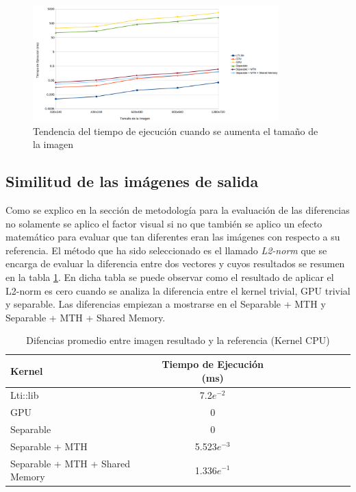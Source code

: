 \documentclass[conference]{IEEEtran}
\begin{document}
\begin{figure}[H]
\centering
\includegraphics[width=9.5cm]{varianza}
\caption{Tendencia del tiempo de ejecución cuando se aumenta el tamaño de la imagen}
\label{resol}
\end{figure}


\subsection{\textbf{Similitud de las imágenes de salida}}
Como se explico en la sección de metodología para la evaluación de las diferencias no solamente se aplico el factor visual si no que también se aplico un efecto matemático para evaluar que tan diferentes eran las imágenes con respecto a su referencia. El método que ha sido seleccionado es el llamado \textit{L2-norm} que se encarga de evaluar la diferencia entre dos vectores y cuyos resultados se resumen en la tabla \ref{table_l2norm}. En dicha tabla se puede observar como el resultado de aplicar el L2-norm es cero cuando se analiza la diferencia entre el kernel trivial, GPU trivial y separable. Las diferencias empiezan a mostrarse en el Separable + MTH y Separable + MTH + Shared Memory. 
\begin{table}[h]
\caption{Difencias promedio entre imagen resultado y la referencia (Kernel CPU)} %
\centering %
\begin{tabular}{l c c rrrrrrr} %
\hline\hline %
Kernel & Tiempo de Ejecución (ms)\\ [0.5ex]
\hline %
Lti::lib & 7.2$ e^{-2}$\\[0.5ex]
GPU & 0\\[0.5ex]
Separable & 0\\[0.5ex]
Separable + MTH & 5.523$ e^{-3} $\\ [0.5ex]%
Separable + MTH + Shared Memory & 1.336$ e^{-1}$\\[0.5ex]
\hline %
\end{tabular}
\label{table_l2norm}
\end{table}
\end{document}
